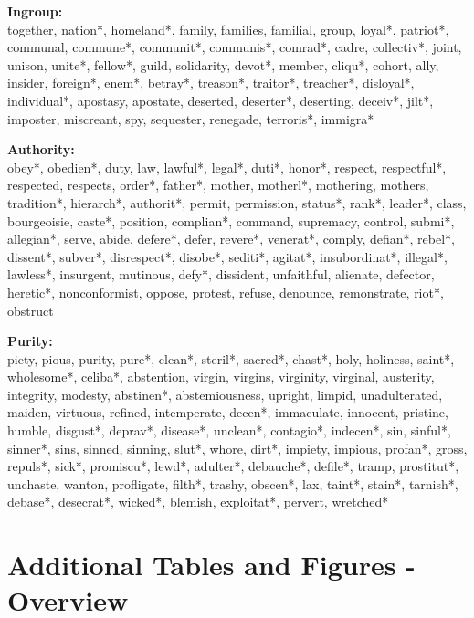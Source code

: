 \documentclass[12pt]{article}
\begin{document}
\textbf{Ingroup:}\\
together, nation*, homeland*, family, families, familial, group, loyal*, patriot*, communal, commune*, communit*, communis*, comrad*, cadre, collectiv*, joint, unison, unite*, fellow*, guild, solidarity, devot*, member, cliqu*, cohort, ally, insider, foreign*, enem*, betray*, treason*, traitor*, treacher*, disloyal*, individual*, apostasy, apostate, deserted, deserter*, deserting, deceiv*, jilt*, imposter, miscreant, spy, sequester, renegade, terroris*, immigra*
\vspace{.5cm}

\textbf{Authority:}\\
obey*, obedien*, duty, law, lawful*, legal*, duti*, honor*, respect, respectful*, respected, respects, order*, father*, mother, motherl*, mothering, mothers, tradition*, hierarch*, authorit*, permit, permission, status*, rank*, leader*, class, bourgeoisie, caste*, position, complian*, command, supremacy, control, submi*, allegian*, serve, abide, defere*, defer, revere*, venerat*, comply, defian*, rebel*, dissent*, subver*, disrespect*, disobe*, sediti*, agitat*, insubordinat*, illegal*, lawless*, insurgent, mutinous, defy*, dissident, unfaithful, alienate, defector, heretic*, nonconformist, oppose, protest, refuse, denounce, remonstrate, riot*, obstruct
\vspace{.5cm}

\textbf{Purity:}\\
piety, pious, purity, pure*, clean*, steril*, sacred*, chast*, holy, holiness, saint*, wholesome*, celiba*, abstention, virgin, virgins, virginity, virginal, austerity, integrity, modesty, abstinen*, abstemiousness, upright, limpid, unadulterated, maiden, virtuous, refined, intemperate, decen*, immaculate, innocent, pristine, humble, disgust*, deprav*, disease*, unclean*, contagio*, indecen*, sin, sinful*, sinner*, sins, sinned, sinning, slut*, whore, dirt*, impiety, impious, profan*, gross, repuls*, sick*, promiscu*, lewd*, adulter*, debauche*, defile*, tramp, prostitut*, unchaste, wanton, profligate, filth*, trashy, obscen*, lax, taint*, stain*, tarnish*, debase*, desecrat*, wicked*, blemish, exploitat*, pervert, wretched*


\clearpage
\section{Additional Tables and Figures - Overview}
\renewcommand\thefigure{\thesection.\arabic{figure}}
\renewcommand\thetable{\thesection.\arabic{table}}
\setcounter{figure}{0}
\setcounter{table}{0}
\end{document}
